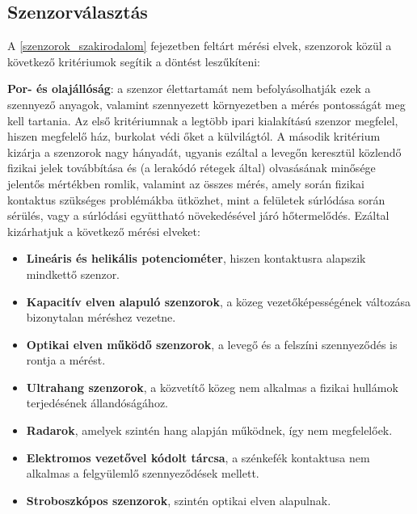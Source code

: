 \subsection{Szenzorválasztás}

A \ref{szenzorok_szakirodalom} fejezetben feltárt mérési elvek, szenzorok közül a következő kritériumok segítik a döntést leszűkíteni:

\textbf{Por- és olajállóság}: a szenzor élettartamát nem befolyásolhatják ezek a szennyező anyagok, valamint szennyezett környezetben a mérés pontosságát meg kell tartania. Az első kritériumnak a legtöbb ipari kialakítású szenzor megfelel, hiszen megfelelő ház, burkolat védi őket a külvilágtól. A második kritérium kizárja a szenzorok nagy hányadát, ugyanis ezáltal a levegőn keresztül közlendő fizikai jelek továbbítása és (a lerakódó rétegek által) olvasásának minősége jelentős mértékben romlik, valamint az összes mérés, amely során fizikai kontaktus szükséges problémákba ütközhet, mint a felületek súrlódása során sérülés, vagy a súrlódási együttható növekedésével járó hőtermelődés. Ezáltal kizárhatjuk a következő mérési elveket: 
\begin{itemize}
	\item \textbf{Lineáris és helikális potenciométer}, hiszen kontaktusra alapszik mindkettő szenzor.
	\item \textbf{Kapacitív elven alapuló szenzorok}, a közeg vezetőképességének változása bizonytalan méréshez vezetne.
	\item \textbf{Optikai elven működő szenzorok}, a levegő és a felszíni szennyeződés is rontja a mérést.
	\item \textbf{Ultrahang szenzorok}, a közvetítő közeg nem alkalmas a fizikai hullámok terjedésének állandóságához.
	\item \textbf{Radarok}, amelyek szintén hang alapján működnek, így nem megfelelőek.
	\item \textbf{Elektromos vezetővel kódolt tárcsa}, a szénkefék kontaktusa nem alkalmas a felgyülemlő szennyeződések mellett.
	\item \textbf{Stroboszkópos szenzorok}, szintén optikai elven alapulnak.
\end{itemize}

